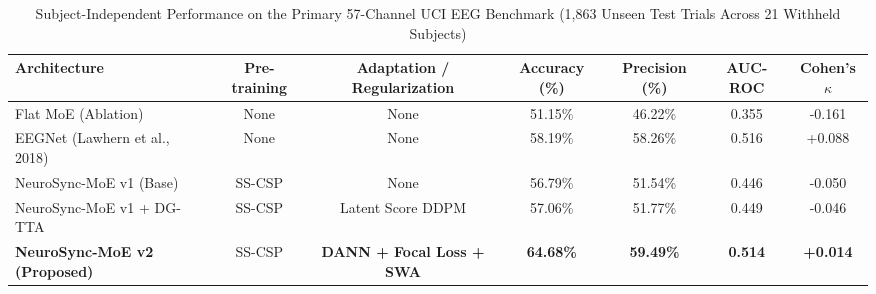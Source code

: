 \begin{table}[t]
\centering
\caption{Subject-Independent Performance on the Primary 57-Channel UCI EEG Benchmark (1,863 Unseen Test Trials Across 21 Withheld Subjects)}
\label{tab:primary_benchmark}
\begin{tabular}{lcccccc}
\hline
\textbf{Architecture} & \textbf{Pre-training} & \textbf{Adaptation / Regularization} & \textbf{Accuracy (\%)} & \textbf{Precision (\%)} & \textbf{AUC-ROC} & \textbf{Cohen's $\kappa$} \\
\hline
Flat MoE (Ablation) & None & None & 51.15\% & 46.22\% & 0.355 & -0.161 \\
EEGNet (Lawhern et al., 2018) & None & None & 58.19\% & 58.26\% & 0.516 & +0.088 \\
NeuroSync-MoE v1 (Base) & SS-CSP & None & 56.79\% & 51.54\% & 0.446 & -0.050 \\
NeuroSync-MoE v1 + DG-TTA & SS-CSP & Latent Score DDPM & 57.06\% & 51.77\% & 0.449 & -0.046 \\
\textbf{NeuroSync-MoE v2 (Proposed)} & SS-CSP & \textbf{DANN + Focal Loss + SWA} & \textbf{64.68\%} & \textbf{59.49\%} & \textbf{0.514} & \textbf{+0.014} \\
\hline
\end{tabular}
\end{table}
